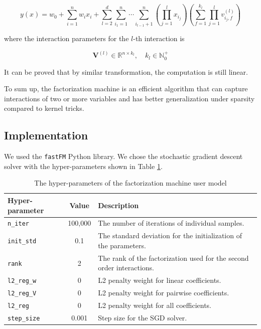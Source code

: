         \[
        y(x) = w_0 + \sum_{i=1}^n w_ix_i +
        \sum_{l=2}^d\sum_{i_1=1}^n\cdots\sum_{i_{l-1}+1}^n \left( \prod_{j=1}^l x_{i_j} \right)
        \left( \sum_{f=1}^{k_l}\prod_{j=1}^l v_{i_j,f}^{(l)} \right)
        \]

        where the interaction parameters for the $l$-th interaction is

        \[
        \bm{V}^{(l)} \in \mathbb{R}^{n \times k_l}, \quad k_l \in \mathbb{N}_0^+
        \]

        It can be proved that by similar transformation, the computation is still linear. \cite{Rendle2010}

        To sum up, the factorization machine is an efficient algorithm
        that can capture interactions of two or more variables
        and has better generalization under sparsity compared to kernel tricks.

    \subsection{Implementation}

        We used the \verb|fastFM|\cite{bayer_fastfm:_2016} Python library.
        We chose the stochastic gradient descent solver with the hyper-parameters shown in Table \ref{table:fm param}.

        \begin{table}[hpbt]
        \centering
        \begin{tabular}{lcl}
            \hline
            Hyper-parameter & Value & Description \\
            \hline
            \verb|n_iter|    & 100,000 & The number of iterations of individual samples. \\
            \verb|init_std|  & 0.1 & The standard deviation for the initialization of the parameters. \\
            \verb|rank|      & 2 & The rank of the factorization used for the second order interactions. \\
            \verb|l2_reg_w|  & 0 & L2 penalty weight for linear coefficients. \\
            \verb|l2_reg_V|  & 0 & L2 penalty weight for pairwise coefficients. \\
            \verb|l2_reg|    & 0 & L2 penalty weight for all coefficients. \\
            \verb|step_size| & 0.001 & Step size for the SGD solver. \\
            \hline
        \end{tabular}
        \caption{The hyper-parameters of the factorization machine user model}
        \label{table:fm param}
        \end{table}

